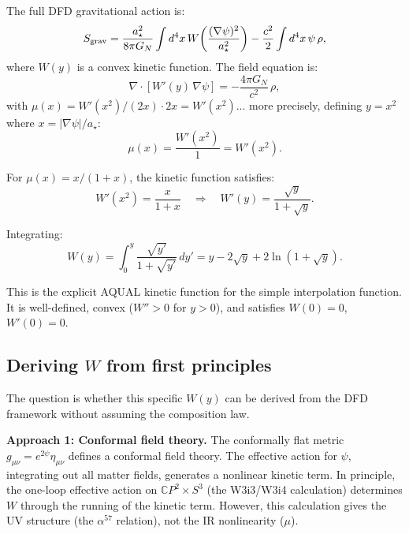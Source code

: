 \documentclass[11pt]{article}
\newcommand{\GN}{G_N}
\newcommand{\mufd}{\mu}
\newcommand{\CP}{\mathbb{C}P}
\begin{document}
The full DFD gravitational action is:
\begin{equation}
S_{\rm grav} = \frac{a_\star^2}{8\pi\GN}\int d^4x\,
W\!\left(\frac{(\nabla\psi)^2}{a_\star^2}\right)
- \frac{c^2}{2}\int d^4x\,\psi\,\rho,
\label{eq:full-action}
\end{equation}
where $W(y)$ is a convex kinetic function. The field equation is:
\begin{equation}
\nabla\cdot\left[W'(y)\,\nabla\psi\right] = -\frac{4\pi\GN}{c^2}\,\rho,
\label{eq:from-action}
\end{equation}
with $\mufd(x) = W'(x^2)/(2x)\cdot 2x = W'(x^2)$... more precisely,
defining $y = x^2$ where $x = |\nabla\psi|/a_\star$:
\begin{equation}
\mufd(x) = \frac{W'(x^2)}{1} = W'(x^2).
\end{equation}

For $\mufd(x) = x/(1+x)$, the kinetic function satisfies:
\begin{equation}
W'(x^2) = \frac{x}{1+x} \quad\Rightarrow\quad
W'(y) = \frac{\sqrt{y}}{1+\sqrt{y}}.
\end{equation}

Integrating:
\begin{equation}
W(y) = \int_0^y \frac{\sqrt{y'}}{1+\sqrt{y'}}\,dy'
= y - 2\sqrt{y} + 2\ln(1+\sqrt{y}).
\label{eq:W-explicit}
\end{equation}

This is the explicit AQUAL kinetic function for the simple
interpolation function. It is well-defined, convex ($W'' > 0$ for
$y > 0$), and satisfies $W(0) = 0$, $W'(0) = 0$.

\subsection{Deriving $W$ from first principles}

The question is whether this specific $W(y)$ can be derived from the
DFD framework without assuming the composition law.

\textbf{Approach 1: Conformal field theory.}
The conformally flat metric $g_{\mu\nu} = e^{2\psi}\eta_{\mu\nu}$
defines a conformal field theory. The effective action for $\psi$,
integrating out all matter fields, generates a nonlinear kinetic term.
In principle, the one-loop effective action on $\CP^2 \times S^3$
(the W3i3/W3i4 calculation) determines $W$ through the running of the
kinetic term. However, this calculation gives the UV structure
(the $\alpha^{57}$ relation), not the IR nonlinearity ($\mufd$).
\end{document}

